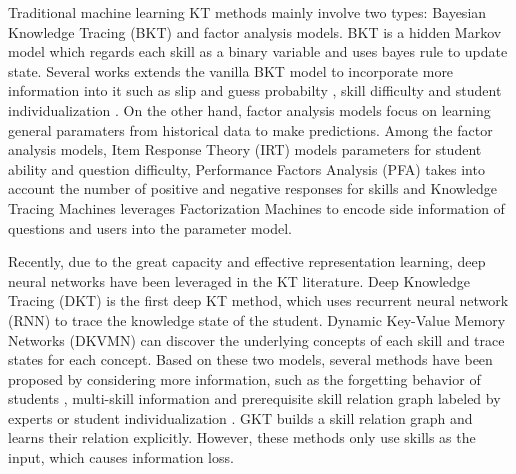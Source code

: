 \documentclass[runningheads]{llncs}
\begin{document}
Traditional machine learning KT methods mainly involve two types: Bayesian Knowledge Tracing (BKT) \cite{corbett1994knowledge} and factor analysis models. BKT is a hidden Markov model which regards each skill as a binary variable and uses bayes rule to update state. Several works extends the vanilla BKT model to incorporate more information into it such as slip and guess probabilty \cite{d2008more}, skill difficulty \cite{pardos2011kt} and student individualization \cite{pardos2010modeling,yudelson2013individualized}. On the other hand, factor analysis models focus on learning general paramaters from historical data to make predictions. Among the factor analysis models, Item Response Theory (IRT) \cite{ebbinghaus2013memory} models parameters for student ability and question difficulty, Performance Factors Analysis (PFA)         \cite{pavlik2009performance} takes into account the number of positive and negative responses for skills  and Knowledge Tracing Machines \cite{vie2019knowledge} leverages Factorization Machines \cite{rendle2010factorization} to encode side information of questions and users into the parameter model. 

Recently, due to the great capacity and effective representation learning, deep neural networks have been leveraged in the KT literature. Deep Knowledge Tracing (DKT) \cite{dkt} is the first deep KT method, which uses recurrent neural network (RNN) to trace the knowledge state of the student. Dynamic Key-Value Memory Networks (DKVMN) \cite{dkvmn} can discover the underlying concepts of each skill and trace states for each concept. Based on these two models, several methods have been proposed by considering more information, such as the forgetting behavior of students \cite{nagatani2019augmenting}, multi-skill information and  prerequisite skill relation graph labeled by experts \cite{chen2018prerequisite} or student individualization \cite{minn2018deep}. GKT \cite{nakagawa2019graph} builds a skill relation graph and learns their relation explicitly. However, these methods only use skills as the input, which causes information loss.
\end{document}
